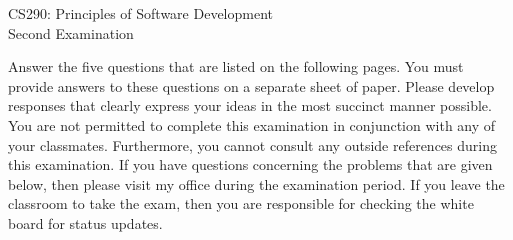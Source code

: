 \documentclass[12pt,epsf,psfig,graphics]{article}
\def\widow#1{\vskip #1\vbadness10000\penalty-200\vskip-#1}
\begin{document}
\def\widow#1{\vskip #1\vbadness10000\penalty-200\vskip-#1}

\begin{center}

CS290: Principles of Software Development \\
Second Examination \\

\end{center}

\noindent
Answer the five questions that are listed on the following pages.  You
must provide answers to these questions on a separate sheet of paper.
Please develop responses that clearly express your ideas in the most
succinct manner possible.  You are not permitted to complete this
examination in conjunction with any of your classmates.  Furthermore,
you cannot consult any outside references during this examination.  If
you have questions concerning the problems that are given below, then
please visit my office during the examination period.  If you leave
the classroom to take the exam, then you are responsible for checking
the white board for status updates.

\end{document}
